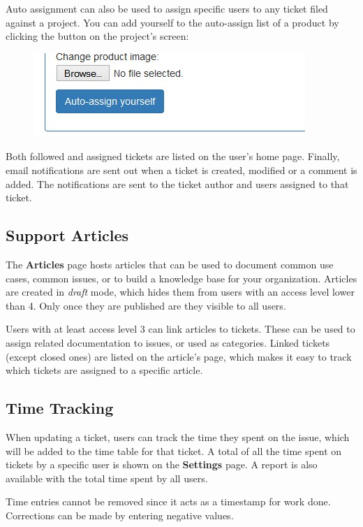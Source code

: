 \documentclass[11pt]{article}
\begin{document}
Auto assignment can also be used to assign specific users to any ticket filed against a project. You can add yourself to the auto-assign list of a product by clicking the button on the project's screen:

\begin{figure}[h]
\includegraphics{autoassign.jpg}
\end{figure}

Both followed and assigned tickets are listed on the user's home page. Finally, email notifications are sent out when a ticket is created, modified or a comment is added. The notifications are sent to the ticket author and users assigned to that ticket.

\subsection{Support Articles}
The \textbf{Articles} page hosts articles that can be used to document common use cases, common issues, or to build a knowledge base for your organization. Articles are created in \textit{draft} mode, which hides them from users with an access level lower than 4. Only once they are published are they visible to all users.

Users with at least access level 3 can link articles to tickets. These can be used to assign related documentation to issues, or used as categories. Linked tickets (except closed ones) are listed on the article's page, which makes it easy to track which tickets are assigned to a specific article.

\subsection{Time Tracking}
When updating a ticket, users can track the time they spent on the issue, which will be added to the time table for that ticket. A total of all the time spent on tickets by a specific user is shown on the \textbf{Settings} page. A report is also available with the total time spent by all users.

Time entries cannot be removed since it acts as a timestamp for work done. Corrections can be made by entering negative values.
\end{document}
